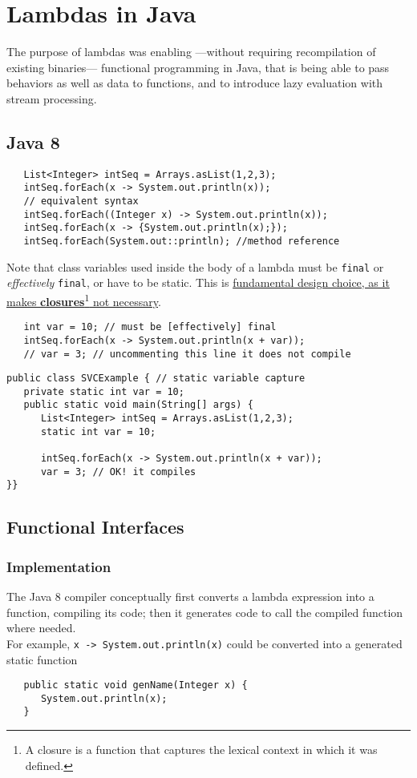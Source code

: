 \chapter{Lambdas in Java}
The purpose of lambdas was enabling ---without requiring recompilation of existing binaries--- functional programming in Java, that is being able to pass behaviors as well as data to functions, and to introduce lazy evaluation with stream processing.
\section{Java 8}
\lstset{style=javaBlockAnn}
\begin{lstlisting}
   List<Integer> intSeq = Arrays.asList(1,2,3);
   intSeq.forEach(x -> System.out.println(x));
   // equivalent syntax
   intSeq.forEach((Integer x) -> System.out.println(x));
   intSeq.forEach(x -> {System.out.println(x);});
   intSeq.forEach(System.out::println); //method reference
\end{lstlisting}

Note that class variables used inside the body of a lambda must be \lstinline|final| or \textit{effectively} \lstinline|final|, or have to be static.
This is \ul{fundamental design choice, as it makes \textbf{closures}\footnote{A closure is a function that captures the lexical context in which it was defined.} not necessary}.
\begin{lstlisting}
   int var = 10; // must be [effectively] final
   intSeq.forEach(x -> System.out.println(x + var));
   // var = 3; // uncommenting this line it does not compile
\end{lstlisting}
\begin{lstlisting}
public class SVCExample { // static variable capture
   private static int var = 10;
   public static void main(String[] args) {
      List<Integer> intSeq = Arrays.asList(1,2,3);
      static int var = 10;
   
      intSeq.forEach(x -> System.out.println(x + var));
      var = 3; // OK! it compiles
}}
   \end{lstlisting}

\section{Functional Interfaces}
\subsection{Implementation}
The Java 8 compiler conceptually first converts a lambda
expression into a function, compiling its code; 
then it generates code to call the compiled function where
needed.\\
For example, \lstinline|x -> System.out.println(x)| could be
converted into a generated static function
\begin{lstlisting}
   public static void genName(Integer x) {
      System.out.println(x);
   }
\end{lstlisting}

